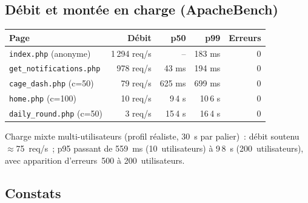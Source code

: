 \documentclass[11pt,a4paper]{article}
\begin{document}
\subsection{Débit et montée en charge (ApacheBench)}

\begin{center}\small
\begin{tabular}{@{}lrrrr@{}}
\toprule
Page & Débit & p50 & p99 & Erreurs \\
\midrule
\texttt{index.php} (anonyme)      & 1\,294 req/s & -- & 183 ms & 0 \\
\texttt{get\_notifications.php}   & 978 req/s & 43 ms & 194 ms & 0 \\
\texttt{cage\_dash.php} (c=50)    & 79 req/s & 625 ms & 699 ms & 0 \\
\texttt{home.php} (c=100)         & 10 req/s & 9\,4 s & 10\,6 s & 0 \\
\texttt{daily\_round.php} (c=50)  & 3 req/s & 15\,4 s & 16\,4 s & 0 \\
\bottomrule
\end{tabular}
\end{center}

Charge mixte multi-utilisateurs (profil réaliste, 30~s par palier)~:
débit soutenu $\approx$75~req/s~; p95 passant de 559~ms (10~utilisateurs) à
9\,8~s (200~utilisateurs), avec apparition d'erreurs~500 à 200~utilisateurs.

\subsection{Constats}
\end{document}

